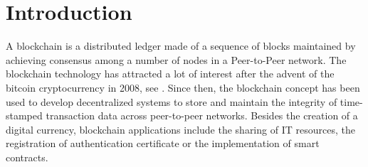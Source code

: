 \chapter{Introduction}\label{sec:introduction}

A blockchain is a distributed ledger made of a sequence of blocks maintained by achieving consensus among a number of nodes in a Peer-to-Peer network. The blockchain technology has attracted a lot of interest after the advent of the bitcoin cryptocurrency in 2008, see \citet{Na08}. Since then, the blockchain concept has been used to develop decentralized systems to store and maintain the integrity of time-stamped transaction data across peer-to-peer networks. Besides the creation of a digital currency, blockchain applications include the sharing of IT resources, the registration of authentication certificate or the implementation of smart contracts. \\

